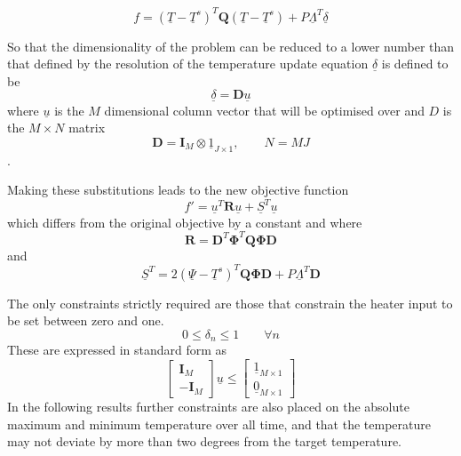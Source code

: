 \documentclass[a4paper, 10 pt, conference]{ieeeconf}  %
\begin{document}
\begin{equation}
f = (\underline{T}-\underline{T}^s)^{T}\mathbf{Q}(\underline{T}-\underline{T}^s)+P\underline{\Lambda}^{T} \underline{\delta}
\end{equation}

So that the dimensionality of the problem can be reduced to a lower number than that defined by the resolution of the temperature update equation $\underline{\delta}$ is defined to be
\begin{equation}
\underline{\delta}=\mathbf{D}\underline{u}
\end{equation}
where $\underline{u}$ is the $M$ dimensional column vector that will be optimised over and $D$ is the $M\times N$ matrix
\begin{equation}
\label{quadthermodimension}
\mathbf{D}=\mathbf{I}_{M} \otimes \underline{1}_{J \times 1},\qquad N=MJ
\end{equation}.

Making these substitutions leads to the new objective function
\begin{equation}
f'=\underline{u}^{T}\mathbf{R}\underline{u}+\underline{S}^{T}\underline{u}
\end{equation}
which differs from the original objective by a constant and where
\begin{equation}
\mathbf{R}=\mathbf{D}^{T}\boldsymbol{\Phi}^{T}\mathbf{Q}\boldsymbol{\Phi}\mathbf{D}
\end{equation}
and
\begin{equation}
\underline{S}^{T}=2(\underline{\Psi}-\underline{T}^s)^{T}\mathbf{Q}\boldsymbol{\Phi}\mathbf{D}+P\underline{\Lambda}^{T} \mathbf{D}
\end{equation}

The only constraints strictly required are those that constrain the heater input to be set between zero and one. 
\begin{equation}
0 \leq \delta_{n} \leq 1 \qquad \forall n
\end{equation}
These are expressed in standard form as
\begin{equation}
\left[
\begin{array}{c}
\mathbf{I}_{M} \\ \hline
- \mathbf{I}_{M} 
\end{array}\right]\underline{u} \leq \left[\begin{array}{c}
\underline{1}_{M \times 1} \\ \hline
\underline{0}_{M \times 1}
\end{array}\right]
\end{equation}
In the following results further constraints are also placed on the absolute maximum and minimum temperature over all time, and that the temperature may not deviate by more than two degrees from the target temperature.
\end{document}
